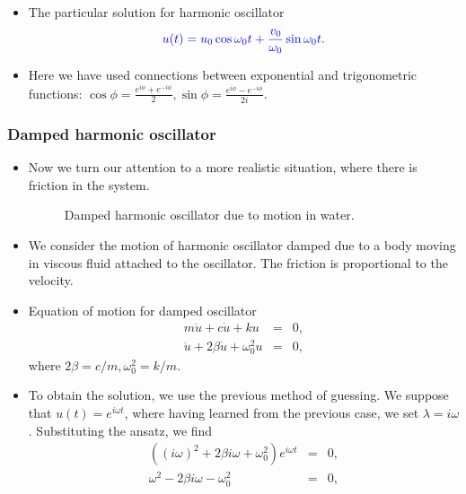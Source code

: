 \documentclass[t,aspectratio=169]{beamer}
\begin{document}
\begin{frame}
\begin{itemize}
\pagebreak
\item The particular solution for harmonic oscillator
$$\textcolor{blue}{u(t)=u_{0}\cos\omega_{0}t+\frac{v_{0}}{\omega_{0}}\sin\omega_{0}t}.$$
\item Here we have used connections between exponential and trigonometric functions: $\cos\phi=\frac{e^{i\phi}+e^{-i\phi}}{2}, \sin\phi=\frac{e^{i\phi}-e^{-i\phi}}{2i}$.
\end{itemize}

\end{frame}


\begin{frame}
\frametitle{Damped harmonic oscillator}
\begin{itemize}
\item Now we turn our attention to a more realistic situation, where there is friction in the system.
\begin{center}
\begin{figure}
\caption{Damped harmonic oscillator due to motion in water.}
\end{figure}
\end{center}
\item We consider the motion of harmonic oscillator damped due to a body moving in viscous fluid attached to the oscillator. The friction is proportional to the velocity.


\pagebreak
\item Equation of motion for damped oscillator
\begin{eqnarray*}
m\ddot{u}+c\dot{u}+ku&=&0, \\
\ddot{u}+2\beta\dot{u}+\omega_{0}^{2}u&=&0,
\end{eqnarray*}
where $2\beta=c/m, \omega_{0}^{2}=k/m$.
\item To obtain the solution, we use the previous method of guessing. We suppose that $u(t)=e^{i\omega t}$, where having learned from the previous case, we set $\lambda=i\omega$. Substituting the ansatz, we find
\begin{eqnarray*}
\left((i\omega)^{2}+2\beta i\omega+\omega_{0}^{2}\right)e^{i\omega t}&=&0, \\
\omega^{2}-2\beta i\omega-\omega_{0}^{2}&=&0,
\end{eqnarray*}


\end{itemize}
\end{frame}
\end{document}
